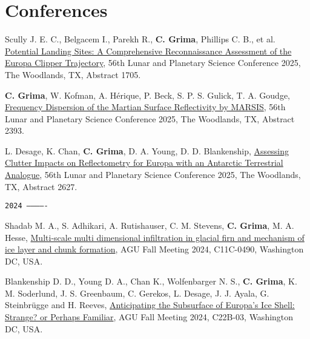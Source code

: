 \section*{Conferences}



\begin{etaremune}
\def\labelenumi{\arabic{enumi}.}


\item
     Scully J. E. C., Belgacem I., Parekh R., \textbf{C. Grima}, Phillips C. B., et al. \href{https://www.hou.usra.edu/meetings/lpsc2025/pdf/1705.pdf}{Potential Landing Sites: A Comprehensive Reconnaissance Assessment of the Europa Clipper Trajectory}, 56th Lunar and Planetary Science Conference 2025, The Woodlands, TX, Abstract 1705.

\item
     \textbf{C. Grima}, W. Kofman, A. Hérique, P. Beck, S. P. S. Gulick, T. A. Goudge, \href{https://www.hou.usra.edu/meetings/lpsc2025/pdf/2393.pdf}{Frequency Dispersion of the Martian Surface Reflectivity by MARSIS}, 56th Lunar and Planetary Science Conference 2025, The Woodlands, TX, Abstract 2393.

\item
     L. Desage, K. Chan, \textbf{C. Grima}, D. A. Young, D. D. Blankenship, \href{https://www.hou.usra.edu/meetings/lpsc2025/pdf/2627.pdf}{Assessing Clutter Impacts on Reflectometry for Europa with an Antarctic Terrestrial Analogue}, 56th Lunar and Planetary Science Conference 2025, The Woodlands, TX, Abstract 2627.

\hspace{-2em}\texttt{2024 -------------}

\item
    Shadab M. A., S. Adhikari, A. Rutishauser, C. M. Stevens, \textbf{C. Grima}, M. A. Hesse, \href{https://agu.confex.com/agu/agu24/meetingapp.cgi/Paper/1526301}{Multi-scale multi dimensional infiltration in glacial firn and mechanism of ice layer and chunk formation}, AGU Fall Meeting 2024, C11C-0490, Washington DC, USA.
    
\item
    Blankenship D. D., Young D. A., Chan K., Wolfenbarger N. S., \textbf{C. Grima}, K. M. Soderlund, J. S. Greenbaum, C. Gerekos, L. Desage, J. J. Ayala, G. Steinbrügge and H. Reeves, \href{https://agu.confex.com/agu/agu24/meetingapp.cgi/Paper/1727443}{Anticipating the Subsurface of Europa’s Ice Shell: Strange? or Perhaps Familiar}, AGU Fall Meeting 2024, C22B-03, Washington DC, USA.
    

\end{etaremune}

